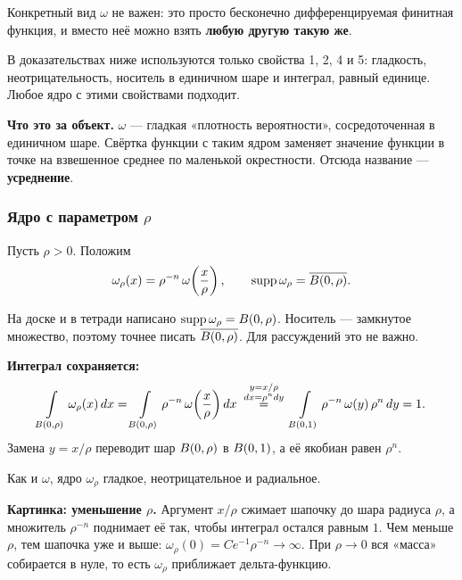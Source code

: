 \begin{remark}[из тетради]
Конкретный вид $\omega$ не важен: это просто бесконечно дифференцируемая финитная функция,
и вместо неё можно взять \textbf{любую другую такую же}.
\end{remark}

\begin{idea}
В доказательствах ниже используются только свойства 1, 2, 4 и 5: гладкость,
неотрицательность, носитель в единичном шаре и интеграл, равный единице. Любое ядро
с этими свойствами подходит.

\medskip
\textbf{Что это за объект.} $\omega$ — гладкая «плотность вероятности», сосредоточенная
в единичном шаре. Свёртка функции с таким ядром заменяет значение функции в точке на
взвешенное среднее по маленькой окрестности. Отсюда название — \textbf{усреднение}.
\end{idea}

\subsubsection*{Ядро с параметром $\rho$}

\begin{definition}
Пусть $\rho > 0$. Положим
\[
  \omega_\rho(x) = \rho^{-n}\, \omega\!\left(\frac{x}{\rho}\right),
  \qquad \operatorname{supp} \omega_\rho = \overline{B(0,\rho)} .
\]
\end{definition}

\begin{warn}
На доске и в тетради написано $\operatorname{supp}\omega_\rho = B(0,\rho)$. Носитель — замкнутое
множество, поэтому точнее писать $\overline{B(0,\rho)}$. Для рассуждений это не важно.
\end{warn}

\textbf{Интеграл сохраняется:}
\[
  \int\limits_{B(0,\rho)} \omega_\rho(x)\, dx
  = \int\limits_{B(0,\rho)} \rho^{-n}\, \omega\!\left(\frac{x}{\rho}\right) dx
  \;\overset{\substack{y = x/\rho\\ dx = \rho^n dy}}{=}\;
  \int\limits_{B(0,1)} \rho^{-n}\, \omega(y)\, \rho^n\, dy = 1 .
\]
Замена $y = x/\rho$ переводит шар $B(0,\rho)$ в $B(0,1)$, а её якобиан равен $\rho^n$.

Как и $\omega$, ядро $\omega_\rho$ гладкое, неотрицательное и радиальное.


\begin{idea}
\textbf{Картинка: уменьшение $\rho$.} Аргумент $x/\rho$ сжимает шапочку до шара радиуса
$\rho$, а множитель $\rho^{-n}$ поднимает её так, чтобы интеграл остался равным $1$.
Чем меньше $\rho$, тем шапочка уже и выше: $\omega_\rho(0) = C e^{-1}\rho^{-n} \to \infty$.
При $\rho \to 0$ вся «масса» собирается в нуле, то есть $\omega_\rho$ приближает
дельта-функцию.
\end{idea}

